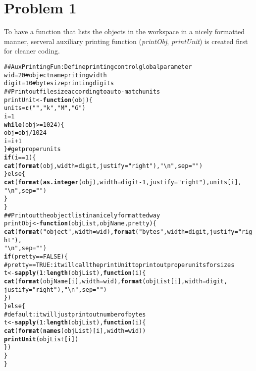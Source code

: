 \documentclass{article}\usepackage{graphicx, color}
\makeatletter
\newcommand{\hlfunctioncall}[1]{\textcolor[rgb]{0.501960784313725,0,0.329411764705882}{\textbf{#1}}}%
\newcommand{\hlstring}[1]{\textcolor[rgb]{0.6,0.6,1}{#1}}%
\newcommand{\hlcomment}[1]{\textcolor[rgb]{0.180392156862745,0.6,0.341176470588235}{#1}}%
\newenvironment{kframe}{%
 \def\at@end@of@kframe{}%
 \ifinner\ifhmode%
  \def\at@end@of@kframe{\end{minipage}}%
  \begin{minipage}{\columnwidth}%
 \fi\fi%
 \def\FrameCommand##1{\hskip\@totalleftmargin \hskip-\fboxsep
 \colorbox{shadecolor}{##1}\hskip-\fboxsep
     \hskip-\linewidth \hskip-\@totalleftmargin \hskip\columnwidth}%
 \MakeFramed {\advance\hsize-\width
   \@totalleftmargin\z@ \linewidth\hsize
   \@setminipage}}%
 {\par\unskip\endMakeFramed%
 \at@end@of@kframe}
\newenvironment{knitrout}{}{} %
\makeatother
\begin{document}
\section*{Problem 1}

To have a function that lists the objects in the workspace in a nicely formatted manner, serveral auxiliary 
printing function (\textit{printObj}, \textit{printUnit}) is created first for cleaner coding. 

\begin{knitrout}
\color{fgcolor}\begin{kframe}
\begin{alltt}
\hlcomment{## Aux Printing Fun: Define printing control global parameter}
wid = 20  \hlcomment{# object name priting width}
digit = 10  \hlcomment{# byte size printing digits}
\hlcomment{## Print out file size according to auto-match units}
printUnit <- \hlfunctioncall{function}(obj) \{
    units = \hlfunctioncall{c}(\hlstring{""}, \hlstring{"k"}, \hlstring{"M"}, \hlstring{"G"})
    i = 1
    \hlfunctioncall{while} (obj >= 1024) \{
        obj = obj/1024
        i = i + 1
    \}  \hlcomment{# get proper units}
    \hlfunctioncall{if} (i == 1) \{
        \hlfunctioncall{cat}(\hlfunctioncall{format}(obj, width = digit, justify = \hlstring{"right"}), \hlstring{"\textbackslash{}n"}, sep = \hlstring{""})
    \} else \{
        \hlfunctioncall{cat}(\hlfunctioncall{format}(\hlfunctioncall{as.integer}(obj), width = digit - 1, justify = \hlstring{"right"}), units[i], 
            \hlstring{"\textbackslash{}n"}, sep = \hlstring{""})
    \}
\}
\hlcomment{## Print out the object list in a nicely formatted way}
printObj <- \hlfunctioncall{function}(objList, objName, pretty) \{
    \hlfunctioncall{cat}(\hlfunctioncall{format}(\hlstring{"object"}, width = wid), \hlfunctioncall{format}(\hlstring{"bytes"}, width = digit, justify = \hlstring{"right"}), 
        \hlstring{"\textbackslash{}n"}, sep = \hlstring{""})
    \hlfunctioncall{if} (pretty == FALSE) \{
        \hlcomment{# pretty==TRUE: it will call the printUnit to print out proper units for sizes}
        t <- \hlfunctioncall{sapply}(1:\hlfunctioncall{length}(objList), \hlfunctioncall{function}(i) \{
            \hlfunctioncall{cat}(\hlfunctioncall{format}(objName[i], width = wid), \hlfunctioncall{format}(objList[i], width = digit, 
                justify = \hlstring{"right"}), \hlstring{"\textbackslash{}n"}, sep = \hlstring{""})
        \})
    \} else \{
        \hlcomment{# default:      it will just print out number of bytes}
        t <- \hlfunctioncall{sapply}(1:\hlfunctioncall{length}(objList), \hlfunctioncall{function}(i) \{
            \hlfunctioncall{cat}(\hlfunctioncall{format}(\hlfunctioncall{names}(objList)[i], width = wid))
            \hlfunctioncall{printUnit}(objList[i])
        \})
    \}
\}
\end{alltt}
\end{kframe}
\end{knitrout}
\end{document}
